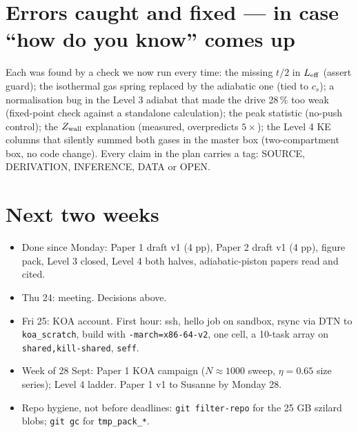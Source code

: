 \documentclass[11pt,a4paper]{article}
\begin{document}
\section{Errors caught and fixed --- in case ``how do you know'' comes up}
Each was found by a check we now run every time: the missing $t/2$ in $L_{\rm eff}$ (assert guard); the isothermal gas spring replaced by the adiabatic one (tied to $c_s$); a normalisation bug in the Level 3 adiabat that made the drive 28\,\% too weak (fixed-point check against a standalone calculation); the peak statistic (no-push control); the $Z_{\rm wall}$ explanation (measured, overpredicts $5\times$); the Level 4 KE columns that silently summed both gases in the master box (two-compartment box, no code change). Every claim in the plan carries a tag: SOURCE, DERIVATION, INFERENCE, DATA or OPEN.

\section{Next two weeks}
\begin{itemize}[leftmargin=1.2em,itemsep=2pt]
\item Done since Monday: Paper 1 draft v1 (4 pp), Paper 2 draft v1 (4 pp), figure pack, Level 3 closed, Level 4 both halves, adiabatic-piston papers read and cited.
\item Thu 24: meeting. Decisions above.
\item Fri 25: KOA account. First hour: ssh, hello job on sandbox, rsync via DTN to \texttt{koa\_scratch}, build with \texttt{-march=x86-64-v2}, one cell, a 10-task array on \texttt{shared,kill-shared}, \texttt{seff}.
\item Week of 28 Sept: Paper 1 KOA campaign ($N \approx 1000$ sweep, $\eta = 0.65$ size series); Level 4 ladder. Paper 1 v1 to Susanne by Monday 28.
\item Repo hygiene, not before deadlines: \texttt{git filter-repo} for the 25 GB szilard blobs; \texttt{git gc} for \texttt{tmp\_pack\_*}.
\end{itemize}
\end{document}

